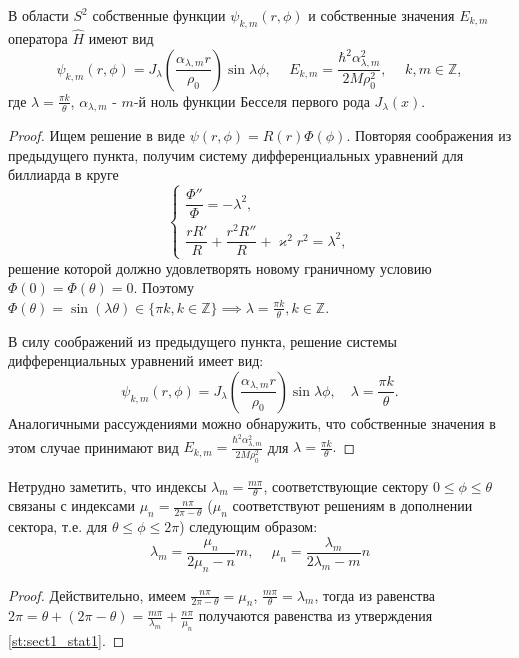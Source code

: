 \begin{statement} \cite[p.~4]{wref13}
В области $S^2$ собственные функции $\psi_{k, m}(r, \phi)$ и собственные значения $E_{k, m}$ оператора $\hat{H}$ имеют вид 
$$\psi_{k, m}(r, \phi) = J_\lambda\left(\frac{\alpha_{\lambda, m}r}{\rho_0}\right)\sin{\lambda\phi}, \hspace{15pt} E_{k, m} = \frac{\hbar^2 \alpha_{\lambda, m}^2}{2M\rho_0^2}, \hspace{15pt} k, m \in \mathbb{Z},$$
где $\lambda = \frac{\pi k}{\theta}$, $\alpha_{\lambda, m}$ - $m$-й ноль функции Бесселя первого рода $J_\lambda(x)$.
\label{st:sect1_stat1}
\end{statement}
\begin{proof}
Ищем решение в виде $\psi(r, \phi) = R(r)\Phi(\phi)$. Повторяя соображения из предыдущего пункта, получим систему дифференциальных уравнений для биллиарда в круге 
\[
\left\{\begin{array}{cc}
    \dfrac{\Phi''}{\Phi} =-\lambda^2, \\
    \dfrac{rR'}{R} + \dfrac{r^2R''}{R} + \varkappa^2r^2 = \lambda^2,
\end{array}
\right.
\]
решение которой должно удовлетворять новому граничному условию $\Phi(0)=\Phi(\theta)=0$. Поэтому $\Phi(\theta) = \sin(\lambda \theta) \in \{\pi k, k \in \mathbb{Z}\} \implies \lambda = \frac{\pi k}{\theta}, k \in \mathbb{Z}$.

В силу соображений из предыдущего пункта, решение системы дифференциальных уравнений имеет вид:
$$\psi_{k, m}(r, \phi) = J_\lambda\left(\frac{\alpha_{\lambda, m}r}{\rho_0}\right)\sin{\lambda\phi} , \quad \lambda=\frac{\pi k}{\theta}.$$
Аналогичными рассуждениями можно обнаружить, что собственные значения в этом случае принимают вид 
$E_{k, m} = \frac{\hbar^2 \alpha_{\lambda, m}^2}{2M\rho_0^2}$ для $\lambda=\frac{\pi k}{\theta}.$
\end{proof}

\begin{consequence} \cite[p.~4]{wref13}
Нетрудно заметить, что индексы $\lambda_m = \frac{m \pi}{\theta}$, соответствующие сектору $0 \leq \phi \leq \theta$ связаны с индексами $\mu_n = \frac{n \pi}{2\pi - \theta}$ ($\mu_n$ соответствуют решениям в дополнении сектора, т.е. для $\theta \leq \phi \leq 2\pi$) следующим образом:
$$\lambda_m = \frac{\mu_n}{2\mu_n - n}m, \hspace{15pt} \mu_n = \frac{\lambda_m}{2\lambda_m - m}n$$
\end{consequence}
\begin{proof}
Действительно, имеем 
$\frac{n \pi}{2\pi - \theta} = \mu_n$, $\frac{m \pi}{\theta} = \lambda_m$, тогда из равенства $2\pi = \theta + (2\pi - \theta) = \frac{m \pi}{\lambda_m} + \frac{n \pi}{\mu_n}$ получаются равенства из утверждения \ref{st:sect1_stat1}.
\end{proof}

